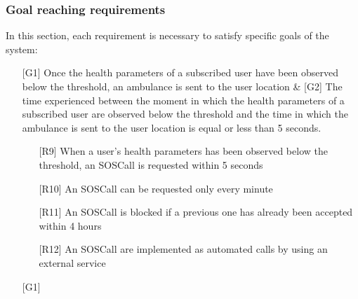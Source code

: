 \subsubsection{Goal reaching requirements}
\par
In this section, each requirement is necessary to satisfy specific goals of the system:
\begin{itemize}
\item[{[G1]}] Once the health parameters of a subscribed user have been observed below the threshold, an ambulance is sent to the user location & [G2] The time experienced between the moment in which the health parameters of a subscribed user are observed below the threshold and the time in which the ambulance is sent to the user location is equal or less than 5 seconds. 
	\begin{itemize}
	\item[{[R9]}] When a user's health parameters has been observed below the threshold, an SOSCall is requested within 5 seconds
	\item[{[R10]}] An SOSCall can be requested only every minute
	\item[{[R11]}] An SOSCall is blocked if a previous one has already been accepted within 4 hours 
	\item[{[R12]}] An SOSCall are implemented as automated calls by using an external service
	\end{itemize}

\item[{[G1]}] 
\end{itemize}